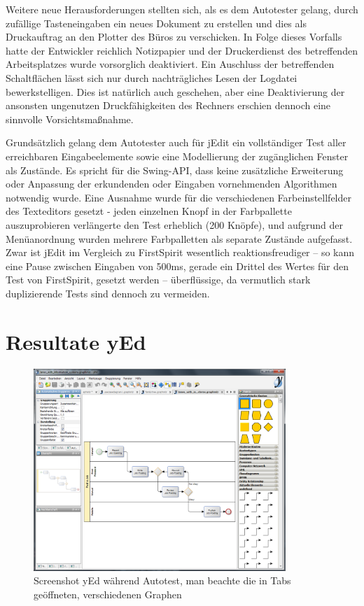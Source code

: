 Weitere neue Herausforderungen stellten sich, als es dem
Autotester gelang, durch zufällige Tasteneingaben ein neues 
Dokument zu erstellen und dies als Druckauftrag 
an den Plotter des Büros zu verschicken. In Folge dieses Vorfalls
hatte der Entwickler reichlich Notizpapier und der Druckerdienst
des betreffenden Arbeitsplatzes wurde vorsorglich deaktiviert.
Ein Auschluss der betreffenden Schaltflächen lässt sich
nur durch nachträgliches Lesen der Logdatei bewerkstelligen.
Dies ist natürlich auch geschehen, aber eine Deaktivierung
der ansonsten ungenutzen Druckfähigkeiten des Rechners
erschien dennoch eine sinnvolle Vorsichtsmaßnahme.

Grundsätzlich gelang dem Autotester auch für jEdit ein
vollständiger Test aller erreichbaren Eingabeelemente
sowie eine Modellierung der zugänglichen Fenster als
Zustände. Es spricht für die Swing-API, dass keine
zusätzliche Erweiterung oder Anpassung der erkundenden
oder Eingaben vornehmenden Algorithmen notwendig wurde.
Eine Ausnahme wurde für die verschiedenen Farbeinstellfelder
des Texteditors gesetzt - jeden einzelnen Knopf in der Farbpallette
auszuprobieren verlängerte den Test erheblich (200 Knöpfe),
und aufgrund der Menüanordnung wurden mehrere Farbpalletten
als separate Zustände aufgefasst. Zwar ist jEdit im Vergleich
zu FirstSpirit wesentlich reaktionsfreudiger -- so kann eine
Pause zwischen Eingaben von 500ms, gerade ein Drittel
des Wertes für den Test von FirstSpirit, gesetzt werden --
überflüssige, da vermutlich stark duplizierende Tests
sind dennoch zu vermeiden.


\section{Resultate yEd}\label{section:testresultsyed}

\begin{figure}
	\centering
	\includegraphics[width=0.85\textwidth]{bilder/screenshot_yed.png}
	\caption{Screenshot yEd während Autotest, man beachte die in Tabs geöffneten, 
	verschiedenen Graphen}
	\label{fig:screenshot_yed}
\end{figure}

